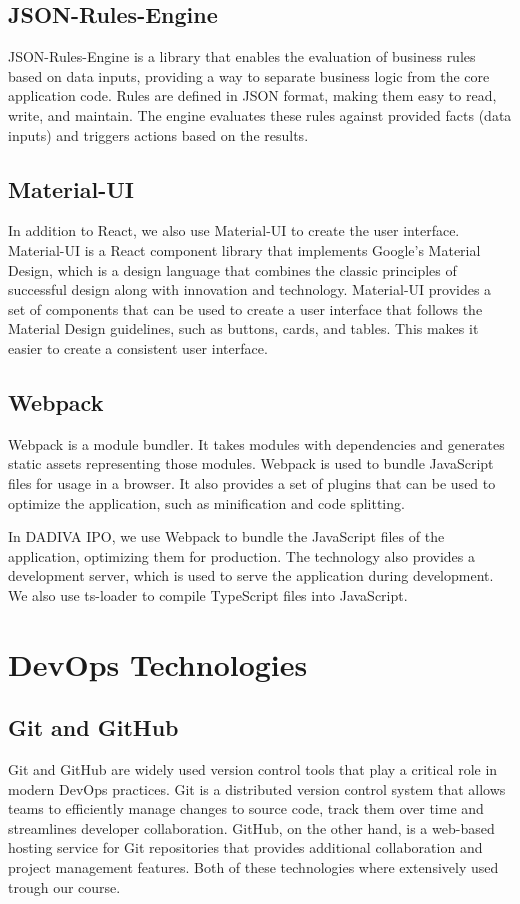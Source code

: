 \subsection{JSON-Rules-Engine}

JSON-Rules-Engine is a library that enables the evaluation of business rules based on data inputs, providing a way to separate business logic from the core application code. Rules are defined in JSON format, making them easy to read, write, and maintain. The engine evaluates these rules against provided facts (data inputs) and triggers actions based on the results.

\subsection{Material-UI}

In addition to React, we also use Material-UI to create the user interface. Material-UI is a React component library that implements Google’s Material Design, which is a design language that combines the classic principles of successful design along with innovation and technology. Material-UI provides a set of components that can be used to create a user interface that follows the Material Design guidelines, such as buttons, cards, and tables. This makes it easier to create a consistent user interface.

\subsection{Webpack}

Webpack is a module bundler. It takes modules with dependencies and generates static assets representing those modules. Webpack is used to bundle JavaScript files for usage in a browser. It also provides a set of plugins that can be used to optimize the application, such as minification and code splitting.

In DADIVA IPO, we use Webpack to bundle the JavaScript files of the application, optimizing them for production. The technology also provides a development server, which is used to serve the application during development. We also use ts-loader to compile TypeScript files into JavaScript.

\section{DevOps Technologies}

\subsection{ Git and GitHub}
Git and GitHub are widely used version control tools that play a critical role in modern DevOps practices. Git is a distributed version control system that allows teams to efficiently manage changes to source code, track them over time and streamlines developer collaboration. GitHub, on the other hand, is a web-based hosting service for Git repositories that provides additional collaboration and project management features. Both of these technologies where extensively used trough our course.

